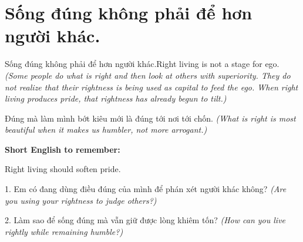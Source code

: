 \section{Sống đúng không phải để hơn người khác.}
\begin{truyen}{Sống đúng không phải để hơn người khác.}{Right living is not a stage for ego.}
\textit{(Some people do what is right and then look at others with superiority. They do not realize that their rightness is being used as capital to feed the ego. When right living produces pride, that rightness has already begun to tilt.)}
\end{truyen}
\begin{baihoc}
Đúng mà làm mình bớt kiêu mới là đúng tới nơi tới chốn.
\textit{(What is right is most beautiful when it makes us humbler, not more arrogant.)}
\end{baihoc}
\begin{ghinhoanh}
\textbf{Short English to remember:}

Right living should soften pride.
\end{ghinhoanh}
\begin{tuhocnhanh}
1. Em có đang dùng điều đúng của mình để phán xét người khác không? \textit{(Are you using your rightness to judge others?)}

2. Làm sao để sống đúng mà vẫn giữ được lòng khiêm tốn? \textit{(How can you live rightly while remaining humble?)}
\end{tuhocnhanh}
\ngancach
